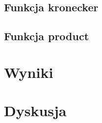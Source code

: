\documentclass[10pt, a4paper]{article}
\begin{document}
\begin{sloppypar}
    \subsection{Funkcja kronecker}


    \subsection{Funkcja product}


    \section{Wyniki}


    \section{Dyskusja}
  \end{sloppypar}
  \newpage
  \begin{sloppypar}
    \medskip


    \printbibliography
    [heading=bibintoc, title={Odwołania}]
  \end{sloppypar}
\end{document}

